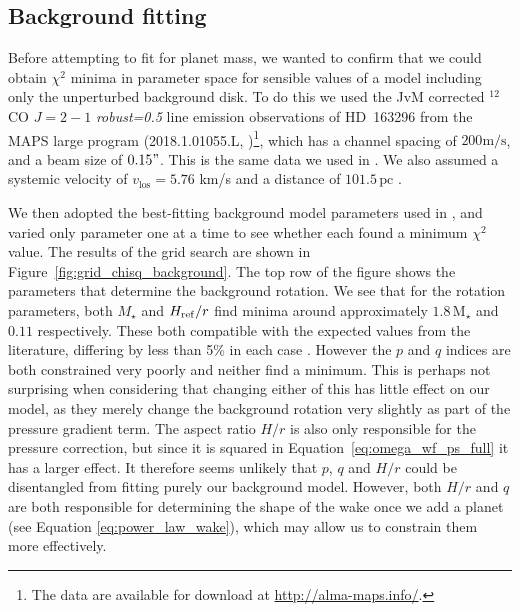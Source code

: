 \subsection{Background fitting}

Before attempting to fit for planet mass, we wanted to confirm that we could obtain $\chi^2$ minima in parameter space for sensible values of a model including only the unperturbed background disk.
To do this we used the JvM corrected \citep{jorsater1995} $^{12}$CO $J=2-1$ \textit{robust=0.5} line emission observations of HD~163296 from the MAPS large program (2018.1.01055.L, \citealt{oberg2021,czekala2021})\footnote{The data are available for download at \url{http://alma-maps.info/}.}, which has a channel spacing of $200 \mathrm{m/s}$, and a beam size of $0.15"$.
This is the same data we used in \citet{calcino2022}.
We also assumed a systemic velocity of $v_{\textrm{los}}= 5.76$ km/s \citep{teague2021} and a distance of $101.5 \, \mathrm{pc}$ \citep{gaiacollaboration2018}.

We then adopted the best-fitting background model parameters used in \citep{calcino2022}, and varied only parameter one at a time to see whether each found a minimum $\chi^2$ value.
The results of the grid search are shown in Figure~\ref{fig:grid_chisq_background}.
The top row of the figure shows the parameters that determine the background rotation.
We see that for the rotation parameters, both $M_\star$ and $H_{\rm ref}/r$ find minima around approximately $1.8 \, \mathrm{M_\star}$ and $0.11$ respectively. 
These both compatible with the expected values from the literature, differing by less than 5\% in each case \citep{pinte2018a}.
However the $p$ and $q$ indices are both constrained very poorly and neither find a minimum.
This is perhaps not surprising when considering that changing either of this has little effect on our model, as they merely change the background rotation very slightly as part of the pressure gradient term.
The aspect ratio $H/r$ is also only responsible for the pressure correction, but since it is squared in Equation~\ref{eq:omega_wf_ps_full} it has a larger effect.
It therefore seems unlikely that $p$, $q$ and $H/r$ could be disentangled from fitting purely our background model.
However, both $H/r$ and $q$ are both responsible for determining the shape of the wake once we add a planet (see Equation \ref{eq:power_law_wake}), which may allow us to constrain them more effectively.

